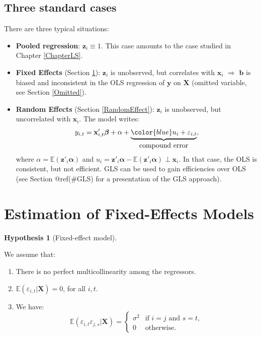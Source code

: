\documentclass[
  12pt,
]{book}
\providecommand{\tightlist}{%
  \setlength{\itemsep}{0pt}\setlength{\parskip}{0pt}}
\theoremstyle{definition}
\theoremstyle{definition}
\theoremstyle{definition}
\theoremstyle{definition}
\newtheorem{hypothesis}{Hypothesis}[chapter]
\theoremstyle{remark}
\begin{document}
\hypertarget{three-standard-cases}{%
\subsection{Three standard cases}\label{three-standard-cases}}

There are three typical situations:

\begin{itemize}
\tightlist
\item
  \textbf{Pooled regression}: \(\mathbf{z}_i \equiv 1\). This case amounts to the case studied in Chapter \ref{ChapterLS}.
\item
  \textbf{Fixed Effects} (Section \ref{FixedEffect}): \(\mathbf{z}_i\) is unobserved, but correlates with \(\mathbf{x}_i\) \(\Rightarrow\) \(\mathbf{b}\) is biased and inconsistent in the OLS regression of \(\mathbf{y}\) on \(\mathbf{X}\) (omitted variable, see Section \ref{Omitted}).
\item
  \textbf{Random Effects} (Section \ref{RandomEffect}): \(\mathbf{z}_i\) is unobserved, but uncorrelated with \(\mathbf{x}_i\). The model writes:
  \[
  y_{i,t} = \mathbf{x}'_{i,t}\boldsymbol\beta + \alpha +  \underbrace{{\color{blue}u_i + \varepsilon_{i,t}}}_{\mbox{compound error}},
  \]
  where \(\alpha = \mathbb{E}(\mathbf{z}'_{i}\boldsymbol\alpha)\) and \(u_i = \mathbf{z}'_{i}\boldsymbol\alpha - \mathbb{E}(\mathbf{z}'_{i}\boldsymbol\alpha) \perp \mathbf{x}_i\). In that case, the OLS is consistent, but not efficient. GLS can be used to gain efficiencies over OLS (see Section @ref(\#GLS) for a presentation of the GLS approach).
\end{itemize}

\hypertarget{FixedEffect}{%
\section{Estimation of Fixed-Effects Models}\label{FixedEffect}}

\begin{hypothesis}[Fixed-effect model]
\protect\hypertarget{hyp:FE}{}\label{hyp:FE}

We assume that:

\begin{enumerate}
\def\labelenumi{\roman{enumi}.}
\tightlist
\item
  There is no perfect multicollinearity among the regressors.
\item
  \(\mathbb{E}(\varepsilon_{i,t}|\mathbf{X})=0\), for all \(i,t\).
\item
  We have:
  \[
  \mathbb{E}(\varepsilon_{i,t}\varepsilon_{j,s}|\mathbf{X}) =
  \left\{
  \begin{array}{cl}
  \sigma^2 & \mbox{if $i=j$ and $s=t$},\\
  0 & \mbox{otherwise.}
  \end{array}\right.
  \]
\end{enumerate}

\end{hypothesis}
\end{document}

